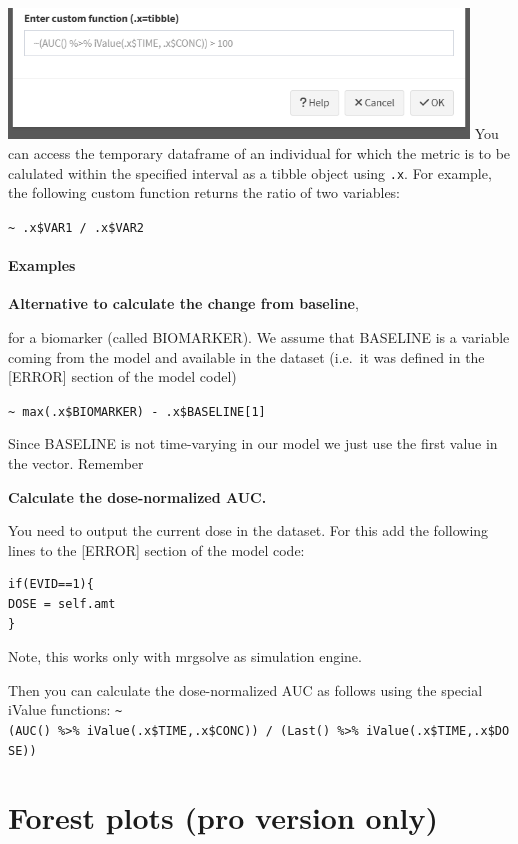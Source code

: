 \documentclass[
]{book}
\begin{document}
\includegraphics[width=4.8125in,height=\textheight]{pictures/custom-metric2.png} You can access the temporary dataframe of an individual for which the metric is to be calulated within the specified interval as a tibble object using \texttt{.x}. For example, the following custom function returns the ratio of two variables:

\texttt{\textasciitilde{}\ .x\$VAR1\ /\ .x\$VAR2}

\subsubsection{Examples}\label{examples}

\textbf{Alternative to calculate the change from baseline},

for a biomarker (called BIOMARKER). We assume that BASELINE is a variable coming from the model and available in the dataset (i.e.~it was defined in the {[}ERROR{]} section of the model codel)

\texttt{\textasciitilde{}\ max(.x\$BIOMARKER)\ -\ .x\$BASELINE{[}1{]}}

Since BASELINE is not time-varying in our model we just use the first value in the vector. Remember

\textbf{Calculate the dose-normalized AUC.}

You need to output the current dose in the dataset. For this add the following lines to the {[}ERROR{]} section of the model code:

\begin{verbatim}
if(EVID==1){
DOSE = self.amt
}
\end{verbatim}

Note, this works only with mrgsolve as simulation engine.

Then you can calculate the dose-normalized AUC as follows using the special iValue functions: \texttt{\textasciitilde{}(AUC()\ \%\textgreater{}\%\ iValue(.x\$TIME,.x\$CONC))\ /\ (Last()\ \%\textgreater{}\%\ iValue(.x\$TIME,.x\$DOSE))}

\chapter{Forest plots (pro version only)}\label{forest-plots-pro-version-only}
\end{document}
